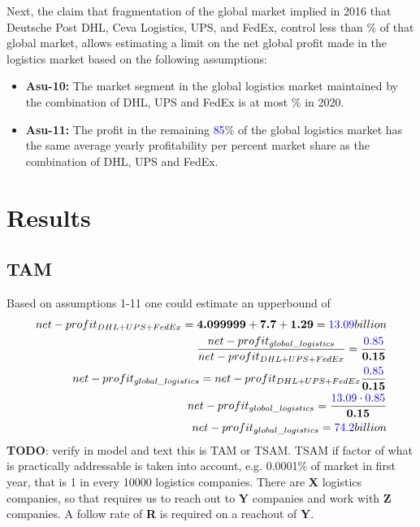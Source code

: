 Next, the claim that fragmentation of the global market implied in 2016 that Deutsche Post DHL, Ceva Logistics, UPS, and FedEx, control less than \textbf{\logisticsmarketsharedhlfedexupspercentage}\% of that global market, allows estimating a limit on the net global profit made in the logistics market based on the following assumptions:

\begin{itemize}
	\item \textbf{Asu-10:} The market segment in the global logistics market maintained by the combination of DHL, UPS and FedEx is at most \textbf{\logisticsmarketsharedhlfedexupspercentage}\% in 2020.
	\item \textbf{Asu-11:} The profit in the remaining \textcolor{blue}{85}\% of the global logistics market has the same average yearly profitability per percent market share as the combination of DHL, UPS and FedEx.
\end{itemize}


\section{Results}
\subsection{TAM}
Based on assumptions 1-11 one could estimate an upperbound of
\begin{equation}
	\begin{split}
		net-profit_{DHL+UPS+FedEx}=\textbf{4.099999}+\textbf{7.7}+\textbf{1.29}=\textcolor{blue}{13.09} billion\\
		\frac{net-profit_{global\_logistics}}{net-profit_{DHL+UPS+FedEx}}=\frac{\textcolor{blue}{0.85}}{\textbf{0.15}}\\
		net-profit_{global\_logistics}=net-profit_{DHL+UPS+FedEx}\frac{\textcolor{blue}{0.85}}{\textbf{0.15}}\\
		net-profit_{global\_logistics}=\frac{\textcolor{blue}{13.09}\cdot\textcolor{blue}{0.85}}{\textbf{0.15}}\\
		net-profit_{global\_logistics}=\textcolor{blue}{74.2} billion
	\end{split}
\end{equation}
\textbf{TODO}: verify in model and text this is TAM or TSAM. TSAM if factor of what is practically addressable is taken into account, e.g. 0.0001\% of market in first year, that is 1 in every 10000 logistics companies. There are \textbf{X} logistics companies, so that requires us to reach out to \textbf{Y} companies and work with \textbf{Z} companies. A follow rate of \textbf{R} is required on a reachout of \textbf{Y}. 

